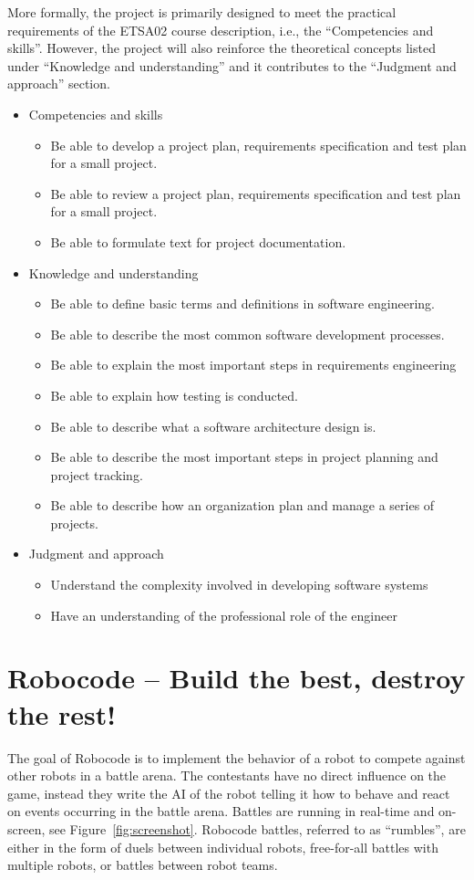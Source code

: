 \documentclass{scrreprt}
\begin{document}
More formally, the project is primarily designed to meet the practical requirements of the ETSA02 course description, i.e., the ``Competencies and skills''. However, the project will also reinforce the theoretical concepts listed under ``Knowledge and understanding'' and it contributes to the ``Judgment and approach'' section.
\begin{itemize}
\item Competencies and skills
\begin{itemize}
\item Be able to develop a project plan, requirements specification and test plan for a small project.
\item Be able to review a project plan, requirements specification and test plan for a small project.
\item Be able to formulate text for project documentation.
\end{itemize}
\item Knowledge and understanding
\begin{itemize}
\item Be able to define basic terms and definitions in software engineering.
\item Be able to describe the most common software development processes.
\item Be able to explain the most important steps in requirements engineering
\item Be able to explain how testing is conducted.
\item Be able to describe what a software architecture design is.
\item Be able to describe the most important steps in project planning and project tracking.
\item Be able to describe how an organization plan and manage a series of projects.
\end{itemize}
\item Judgment and approach
\begin{itemize}
\item Understand the complexity involved in developing software systems
\item Have an understanding of the professional role of the engineer
\end{itemize}
\end{itemize}

\section{Robocode -- Build the best, destroy the rest!}
The goal of Robocode is to implement the behavior of a robot to compete against other robots in a battle arena. The contestants have no direct influence on the game, instead they write the AI of the robot telling it how to behave and react on events occurring in the battle arena. Battles are running in real-time and on-screen, see Figure~\ref{fig:screenshot}. Robocode battles, referred to as ``rumbles'', are either in the form of duels between individual robots, free-for-all battles with multiple robots, or battles between robot teams.
\end{document}
